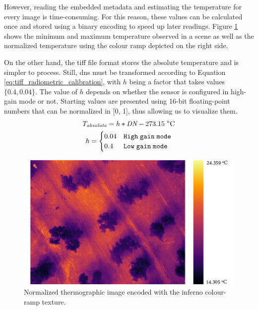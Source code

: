 \vspace{3mm}



However, reading the embedded metadata and estimating the temperature for every image is time-consuming. For this reason, these values can be calculated once and stored using a binary encoding to speed up later readings. Figure \ref{fig:thermal_inferno_temperature} shows the minimum and maximum temperature observed in a scene as well as the normalized temperature using the colour ramp depicted on the right side.

On the other hand, the \acrshort{tiff} file format stores the absolute temperature and is simpler to process. Still, \acrshort{dn}s must be transformed according to Equation \ref{eq:tiff_radiometric_calibration}, with $h$ being a factor that takes values $\{0.4, 0.04\}$. The value of $h$ depends on whether the sensor is configured in high-gain mode or not. Starting values are presented using 16-bit floating-point numbers that can be normalized in [0, 1], thus allowing us to visualize them.
\begin{gather}
    \label{eq:tiff_radiometric_calibration}
    \begin{aligned}
        T_{\textit{absolute}} &= h * \textit{DN} - 273.15 \hspace{1mm} \si{\celsius}\\
    \end{aligned}\\
    h=\begin{cases}
        0.04 &\mathtt{High \hspace{1mm} gain \hspace{1mm} mode}\\
        0.4 &\mathtt{Low \hspace{1mm} gain \hspace{1mm} mode}\\
    \end{cases}
\end{gather}

\begin{figure}[ht]
	\centering
	\includegraphics[width=\linewidth]{figs/materials/thermal_inferno_temperature.png}
	\caption{Normalized thermographic image encoded with the inferno colour-ramp texture. }
	\label{fig:thermal_inferno_temperature}
\end{figure}

